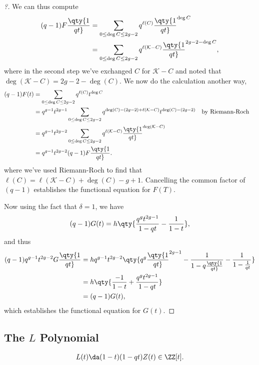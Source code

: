 \begin{proof}[?]
We can thus compute
\begin{align*}  
(q-1) F\qty{1\over qt}
&= \sum_{0\leq \deg C \leq 2g-2} q^{\ell(C)} \qty{1\over {qt} }^{\deg C} \\
&= \sum_{0\leq \deg C \leq 2g-2} q^{\ell(\mathcal{K} - C)} \qty{1\over {qt} }^{2g-2-\deg C}
,\end{align*} where in the second step we've exchanged \(C\) for
\(\mathcal{K}- C\) and noted that
\(\deg(\mathcal{K}-C) = 2g-2-\deg(C)\). We now do the calculation
another way,
\begin{align*}  
(q-1) F(t) 
&= \sum_{0\leq \deg C \leq 2g-2} q^{\ell(C)} t^{\deg C} \\
&=
q^{g-1} t^{2g-1} \sum_{0\leq \deg C \leq 2g-2} q^{\deg(C) - (2g-2) + \ell(\mathcal{K}-C)} t^{\deg(C) - (2g-2)} && \text{by Riemann-Roch} \\
&= q^{g-1} t^{2g-2} \sum_{0 \leq \deg C \leq 2g-2} q^{\ell(\mathcal{K} - C)} \qty{1\over qt}^{\deg(\mathcal{K} - C)} \\
&= q^{g-1} t^{2g-2} (q-1) F\qty{1\over qt}
.\end{align*} where we've used Riemann-Roch to find that
\(\ell(C) = \ell(\mathcal{K}-C) + \deg(C) - g + 1\). Cancelling the
common factor of \((q-1)\) establishes the functional equation for
\(F(T)\).

Now using the fact that \(\delta = 1\), we have
\begin{align*}  
(q-1)G(t) = h \qty{ {q^g t^{2g-1} \over 1-qt} - {1\over 1-t} }
,\end{align*} and thus
\begin{align*}  
(q-1) q^{g-1} t^{2g-2} G\qty{1\over qt}
&= hq^{g-1} t^{2g-2} \qty{q^g \qty{1\over qt}^{2g-1} - {1\over 1 - q \qty{1\over qt}} - {1\over 1 - {1\over qt}} } \\
&=
h\qty{ {-1\over 1-t} + {q^g t^{2g-1} \over 1-qt}} \\
&= (q-1) G(t)
,\end{align*} which establishes the functional equation for \(G(t)\).

\end{proof}

\hypertarget{the-l-polynomial}{%
\subsection{\texorpdfstring{The \(L\)
Polynomial}{The L Polynomial}}\label{the-l-polynomial}}

\begin{definition}

\begin{align*}  
L(t) \da (1-t) (1-qt)  Z(t) \in \ZZ[t]
.\end{align*}

\end{definition}

